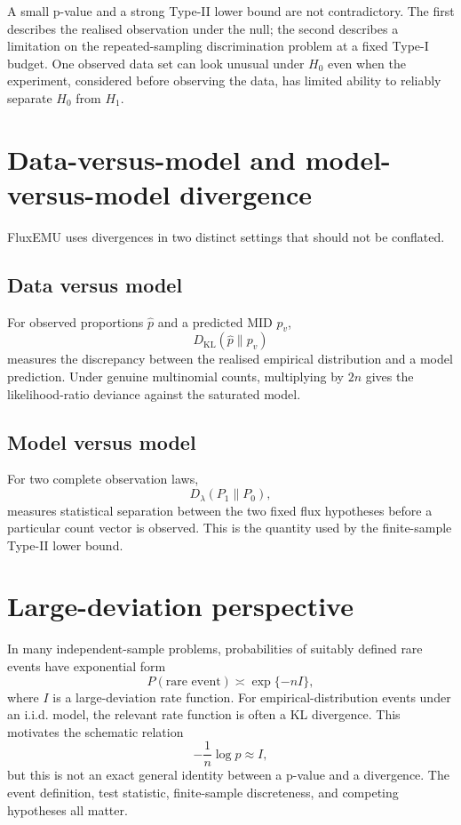 \documentclass[11pt]{article}
\newcommand{\KL}{D_{\mathrm{KL}}}
\begin{document}
A small p-value and a strong Type-II lower bound are not contradictory. The
first describes the realised observation under the null; the second describes
a limitation on the repeated-sampling discrimination problem at a fixed
Type-I budget. One observed data set can look unusual under $H_0$ even when the
experiment, considered before observing the data, has limited ability to
reliably separate $H_0$ from $H_1$.

\section{Data-versus-model and model-versus-model divergence}

FluxEMU uses divergences in two distinct settings that should not be conflated.

\subsection*{Data versus model}
For observed proportions $\widehat p$ and a predicted MID $p_v$,
\begin{equation}
\KL(\widehat p\|p_v)
\end{equation}
measures the discrepancy between the realised empirical distribution and a
model prediction. Under genuine multinomial counts, multiplying by $2n$ gives
the likelihood-ratio deviance against the saturated model.

\subsection*{Model versus model}
For two complete observation laws,
\begin{equation}
D_\lambda(P_1\|P_0),
\end{equation}
measures statistical separation between the two fixed flux hypotheses before a
particular count vector is observed. This is the quantity used by the
finite-sample Type-II lower bound.

\section{Large-deviation perspective}

In many independent-sample problems, probabilities of suitably defined rare
events have exponential form
\begin{equation}
P(\text{rare event})\asymp \exp\{-nI\},
\end{equation}
where $I$ is a large-deviation rate function. For empirical-distribution events
under an i.i.d. model, the relevant rate function is often a KL divergence.
This motivates the schematic relation
\begin{equation}
-\frac{1}{n}\log p \approx I,
\end{equation}
but this is not an exact general identity between a p-value and a divergence.
The event definition, test statistic, finite-sample discreteness, and competing
hypotheses all matter.
\end{document}
